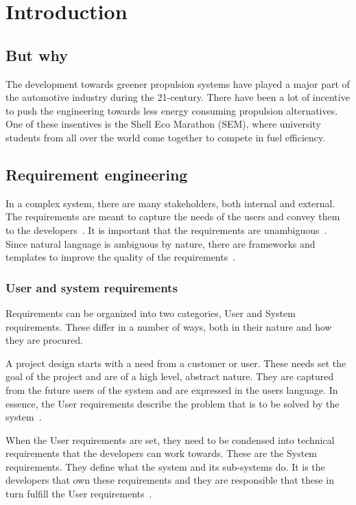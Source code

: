 \chapter{Introduction}
\section{But why}
The development towards greener propulsion systems have played a major part of the automotive industry during the 21-century. There have been a lot of incentive to push the engineering towards less energy consuming propulsion alternatives. One of these insentives is the Shell Eco Marathon (SEM), where university students from all over the world come together to compete in fuel efficiency.

\section{Requirement engineering}
In a complex system, there are many stakeholders, both internal and external.
The requirements are meant to capture the needs of the users and convey them to
the developers~\cite{ibm_req}. It is important that the requirements are
unambiguous~\cite{ibm_req, rupp2014}. Since natural language is ambiguous by
nature, there are frameworks and templates to improve the quality of the
requirements~\cite{rupp2014}. 

\subsection{User and system requirements}
Requirements can be organized into two categories, User and System requirements.
These differ in a number of ways, both in their nature and how they are
procured.

A project design starts with a need from a customer or user. These needs set the
goal of the project and are of a high level, abstract nature. They are captured
from the future users of the system and are expressed in the users language. In
essence, the User requirements describe the problem that is to be solved by the
system~\cite{ibm_req}. 

When the User requirements are set, they need to be condensed into technical
requirements that the developers can work towards. These are the System
requirements. They define what the system and its sub-systems do. It is the
developers that own these requirements and they are responsible that these in
turn fulfill the User requirements~\cite{ibm_req}.

